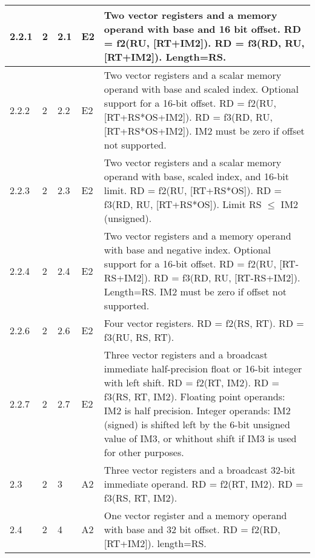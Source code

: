 \documentclass[forwardcom.tex]{subfiles}
\begin{document}
\begin{longtable} {|p{10mm}|p{6mm}|p{9mm}|p{7mm}|p{80mm}|}
\hline
2.2.1 & 2 & 2.1 & E2 & Two vector registers and a memory operand with base and 16 bit offset.\newline 
RD = f2(RU, [RT+IM2]). RD = f3(RD, RU, [RT+IM2]). Length=RS.\\

\hline
2.2.2 & 2 & 2.2 & E2 & Two vector registers and a scalar memory operand with base and scaled
index. Optional support for a 16-bit offset.\newline 
RD = f2(RU, [RT+RS*OS+IM2]). RD = f3(RD, RU, [RT+RS*OS+IM2]). IM2 must be zero if offset not supported.\\

\hline
2.2.3 & 2 & 2.3 & E2 & Two vector registers and a scalar memory operand with base, scaled index, and 16-bit limit.\newline 
RD = f2(RU, [RT+RS*OS]). RD = f3(RD, RU, [RT+RS*OS]). Limit RS $\leq$ IM2 (unsigned).\\

\hline
2.2.4 & 2 & 2.4 & E2 & Two vector registers and a memory operand with base and negative index. Optional support for a 16-bit offset.\newline 
RD = f2(RU, [RT-RS+IM2]). RD = f3(RD, RU, [RT-RS+IM2]). Length=RS. IM2 must be zero if offset not supported.\\

\hline
2.2.6 & 2 & 2.6 & E2 & Four vector registers.\newline 
RD = f2(RS, RT). RD = f3(RU, RS, RT).\\

\hline
2.2.7 & 2 & 2.7 & E2 & Three vector registers and a broadcast immediate half-precision float or 16-bit integer with left shift.\newline 
RD = f2(RT, IM2). RD = f3(RS, RT, IM2).\newline
Floating point operands: IM2 is half precision.
Integer operands: IM2 (signed) is shifted left by the 6-bit unsigned value of IM3, or whithout shift if IM3 is used for other purposes. \\

\hline
2.3 & 2 & 3 & A2 & Three vector registers and a broadcast 32-bit immediate operand.\newline 
RD = f2(RT, IM2). RD = f3(RS, RT, IM2).\\

\hline
2.4 & 2 & 4 & A2 & One vector register and a memory operand with base and 32 bit offset.\newline
RD = f2(RD, [RT+IM2]). length=RS.\\


\end{longtable}
\end{document}
